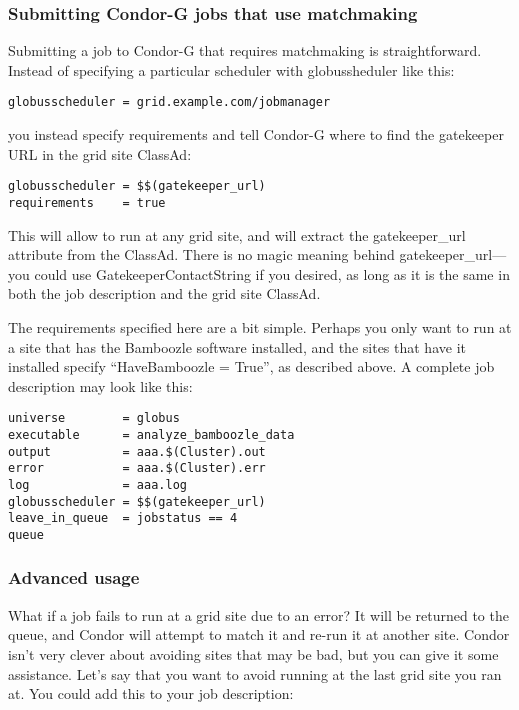 \subsubsection{Submitting Condor-G jobs that use matchmaking}

Submitting a job to Condor-G that requires matchmaking is
straightforward. Instead of specifying a particular scheduler with
globussheduler like this:

\begin{verbatim}
globusscheduler = grid.example.com/jobmanager
\end{verbatim}

you instead specify requirements and tell Condor-G where to find the
gatekeeper URL in the grid site ClassAd:

\begin{verbatim}
globusscheduler = $$(gatekeeper_url)
requirements    = true
\end{verbatim}

This will allow to run at any grid site, and will extract the
gatekeeper\_url attribute from the ClassAd. There is no magic meaning
behind gatekeeper\_url---you could use GatekeeperContactString if you
desired, as long as it is the same in both the job description and the
grid site ClassAd. 

The requirements specified here are a bit simple. Perhaps you only
want to run at a site that has the Bamboozle software installed, and
the sites that have it installed specify ``HaveBamboozle = True'', as
described above. A complete job description may look like this:

\begin{verbatim}
universe        = globus
executable      = analyze_bamboozle_data
output          = aaa.$(Cluster).out
error           = aaa.$(Cluster).err
log             = aaa.log
globusscheduler = $$(gatekeeper_url)
leave_in_queue  = jobstatus == 4
queue
\end{verbatim}

\subsubsection{Advanced usage}

What if a job fails to run at a grid site due to an error? It will be
returned to the queue, and Condor will attempt to match it and
re-run it at another site. Condor isn't very clever about avoiding
sites that may be bad, but you can give it some assistance. Let's say
that you want to avoid running at the last grid site you ran at. You
could add this to your job description:


